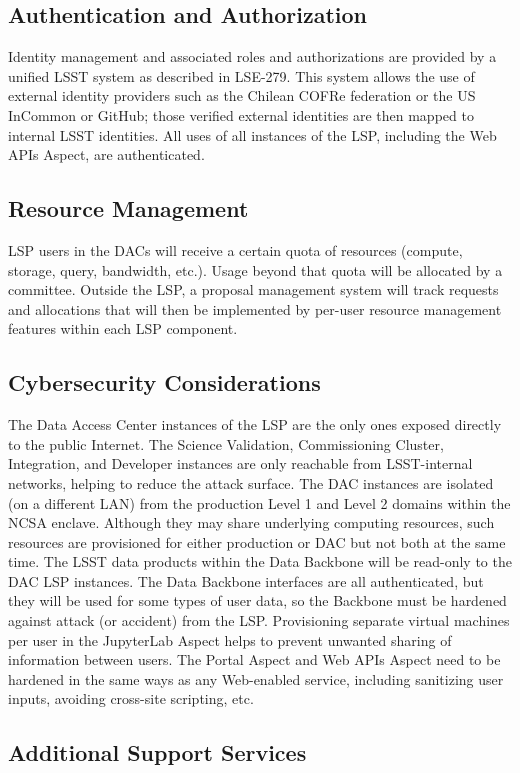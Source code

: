 \subsection{Authentication and Authorization}\label{authentication-and-authorization}

Identity management and associated roles and authorizations are provided by a
unified LSST system as described in LSE-279.  This system allows the use of
external identity providers such as the Chilean COFRe federation \citep{COFRe}
or the US InCommon \citep{InCommon} or GitHub; those verified external
identities are then mapped to internal LSST identities.  All uses of all
instances of the LSP, including the Web APIs Aspect, are authenticated.

\subsection{Resource Management}\label{resource-management}

LSP users in the DACs will receive a certain quota of resources (compute,
storage, query, bandwidth, etc.).  Usage beyond that quota will be allocated by
a committee.  Outside the LSP, a proposal management system will track requests
and allocations that will then be implemented by per-user resource management
features within each LSP component.

\subsection{Cybersecurity Considerations}\label{cybersecurity-considerations}

The Data Access Center instances of the LSP are the only ones exposed directly
to the public Internet.  The Science Validation, Commissioning Cluster,
Integration, and Developer instances are only reachable from LSST-internal
networks, helping to reduce the attack surface.  The DAC instances are isolated
(on a different LAN) from the production Level 1 and Level 2 domains within the
NCSA enclave.  Although they may share underlying computing resources, such
resources are provisioned for either production or DAC but not both at the
same time.  The LSST data products within the Data Backbone will be read-only
to the DAC LSP instances.  The Data Backbone interfaces are all authenticated,
but they will be used for some types of user data, so the Backbone must be
hardened against attack (or accident) from the LSP.  Provisioning separate
virtual machines per user in the JupyterLab Aspect helps to prevent unwanted
sharing of information between users.  The Portal Aspect and Web APIs Aspect
need to be hardened in the same ways as any Web-enabled service, including
sanitizing user inputs, avoiding cross-site scripting, etc.

\subsection{Additional Support Services}\label{additional-support-services}

